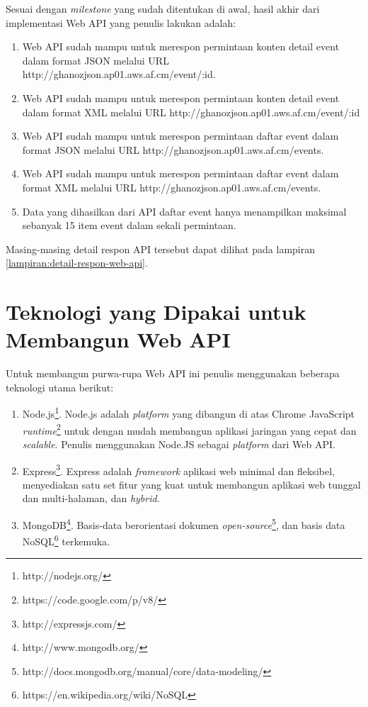 \documentclass[a4paper, 12pt, oneside]{report}
\begin{document}
\onehalfspacing Sesuai dengan \textit{milestone} yang sudah ditentukan di awal, hasil akhir dari implementasi Web API yang penulis lakukan adalah:

\begin{enumerate}
  \item Web API sudah mampu untuk merespon permintaan konten detail event dalam format JSON melalui URL http://ghanozjson.ap01.aws.af.cm/event/:id.
  \item Web API sudah mampu untuk merespon permintaan konten detail event dalam format XML melalui URL http://ghanozjson.ap01.aws.af.cm/event/:id
  \item Web API sudah mampu untuk merespon permintaan daftar event dalam format JSON melalui URL http://ghanozjson.ap01.aws.af.cm/events.
  \item Web API sudah mampu untuk merespon permintaan daftar event dalam format XML melalui URL http://ghanozjson.ap01.aws.af.cm/events.
  \item Data yang dihasilkan dari API daftar event hanya menampilkan maksimal sebanyak 15 item event dalam sekali permintaan.
\end{enumerate}

\onehalfspacing Masing-masing detail respon API tersebut dapat dilihat pada lampiran \ref{lampiran:detail-respon-web-api}.

\section{Teknologi yang Dipakai untuk Membangun Web API}

\onehalfspacing Untuk membangun purwa-rupa Web API ini penulis menggunakan beberapa teknologi utama berikut:

\begin{enumerate}
  \item Node.js\footnote{http://nodejs.org/}. Node.js adalah \textit{platform} yang dibangun di atas Chrome JavaScript \textit{runtime}\footnote{https://code.google.com/p/v8/} untuk dengan mudah membangun aplikasi jaringan yang cepat dan \textit{scalable}. Penulis menggunakan Node.JS sebagai \textit{platform} dari Web API.
  \item Express\footnote{http://expressjs.com/}. Express adalah \textit{framework} aplikasi web minimal dan fleksibel, menyediakan satu set fitur yang kuat untuk membangun aplikasi web tunggal dan multi-halaman, dan \textit{hybrid}.
  \item MongoDB\footnote{http://www.mongodb.org/}. Basis-data berorientasi dokumen \textit{open-source}\footnote{http://docs.mongodb.org/manual/core/data-modeling/}, dan basis data NoSQL\footnote{https://en.wikipedia.org/wiki/NoSQL} terkemuka.
\end{enumerate}
\end{document}
